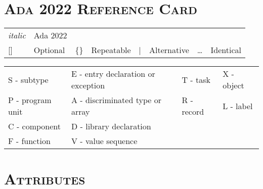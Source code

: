 \begin{multicols*}{\columnnr} %
\raggedcolumns
\begin{scriptsize} %
\section*{\textsc{Ada 2022 Reference Card}}
\begin{tabular}{@{}l l l l l l l l}
\textit{italic} & Ada 2022 &&&&&&\\
{[]} & Optional & \{\} & Repeatable & | & Alternative & \dots & Identical\\
\end{tabular}
\newline
\smallskip
\newline
\begin{tabular}{@{}l l l l}
   S - subtype & E - entry declaration or exception & T - task & X - object\\
   P - program unit & A - discriminated type or array & R - record & L - label\\
   C - component & D - library declaration &&\\
   F - function & V - value sequence &&\\
\end{tabular}
\section*{\textsc{Attributes}}
\RaggedRight


\end{scriptsize}
\end{multicols*}

